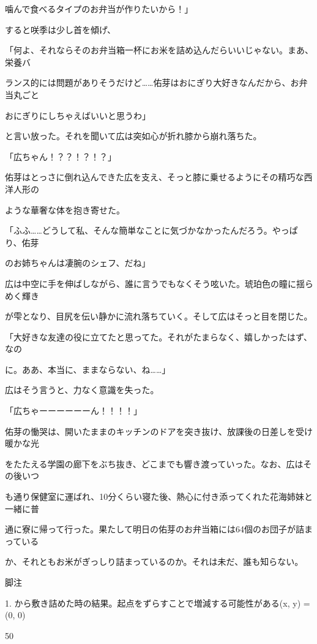 噛んで⾷べるタイプのお弁当が作りたいから！」\par
すると咲季は少し⾸を傾げ、\par
「何よ、それならそのお弁当箱⼀杯にお⽶を詰め込んだらいいじゃない。まあ、栄養バ\par
ランス的には問題がありそうだけど……佑芽はおにぎり⼤好きなんだから、お弁当丸ごと\par
おにぎりにしちゃえばいいと思うわ」\par
と⾔い放った。それを聞いて広は突如⼼が折れ膝から崩れ落ちた。\par
「広ちゃん！？？！？！？」\par
佑芽はとっさに倒れ込んできた広を⽀え、そっと膝に乗せるようにその精巧な西洋⼈形の\par
ような華奢な体を抱き寄せた。\par
「ふふ……どうして私、そんな簡単なことに気づかなかったんだろう。やっぱり、佑芽\par
のお姉ちゃんは凄腕のシェフ、だね」\par
広は中空に⼿を伸ばしながら、誰に⾔うでもなくそう呟いた。琥珀⾊の瞳に揺らめく輝き\par
が雫となり、⽬尻を伝い静かに流れ落ちていく。そして広はそっと⽬を閉じた。\par
「⼤好きな友達の役に⽴てたと思ってた。それがたまらなく、嬉しかったはず、なの\par
に。ああ、本当に、ままならない、ね……」\par
広はそう⾔うと、⼒なく意識を失った。\par
「広ちゃーーーーーーん！！！！」\par
佑芽の慟哭は、開いたままのキッチンのドアを突き抜け、放課後の⽇差しを受け暖かな光\par
をたたえる学園の廊下をぶち抜き、どこまでも響き渡っていった。なお、広はその後いつ\par
も通り保健室に運ばれ、10分くらい寝た後、熱⼼に付き添ってくれた花海姉妹と⼀緒に普\par
通に寮に帰って⾏った。果たして明⽇の佑芽のお弁当箱には64個のお団⼦が詰まっている\par
か、それともお⽶がぎっしり詰まっているのか。それは未だ、誰も知らない。\par
脚注\par
1. から敷き詰めた時の結果。起点をずらすことで増減する可能性がある(x, y) = (0, 0)\par
50\par

